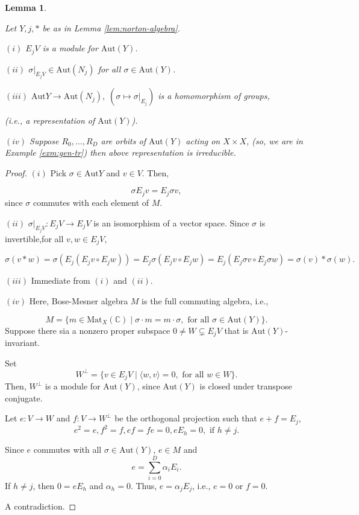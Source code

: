 \documentclass[
]{book}
\newtheorem{lemma}{Lemma}[chapter]
\theoremstyle{definition}
\theoremstyle{definition}
\theoremstyle{definition}
\theoremstyle{definition}
\theoremstyle{remark}
\begin{document}
\begin{lemma}
\protect\hypertarget{lem:autom-of-norton-algebra}{}\label{lem:autom-of-norton-algebra}

Let \(Y, j, \ast\) be as in Lemma \ref{lem:norton-algebra}.

\((i)\) \(E_jV\) is a module for \(\mathrm{Aut}(Y)\).

\((ii)\) \(\sigma|_{E_jV}\in \mathrm{Aut}(N_j)\) for all \(\sigma \in \mathrm{Aut}(Y)\).

\((iii)\) \(\mathrm{Aut}Y \longrightarrow \mathrm{Aut}(N_j), \; (\sigma \mapsto \sigma|_{E_j})\) is a homomorphism of groups,

(i.e., a representation of \(\mathrm{Aut}(Y)\)).

\((iv)\) Suppose \(R_0, \ldots, R_D\) are orbits of \(\mathrm{Aut}(Y)\) acting on \(X\times X\), (so, we are in Example \ref{exm:gen-tr}) then above representation is irreducible.

\end{lemma}

\begin{proof}
\leavevmode

\((i)\) Pick \(\sigma\in \mathrm{Aut}Y\) and \(v\in V\). Then,

\[\sigma E_j v = E_j\sigma v,\]
since \(\sigma\) commutes with each element of \(M\).

\((ii)\) \(\sigma|_{E_jV}: E_jV \to E_jV\) is an isomorphism of a vector space. Since \(\sigma\) is invertible,for all \(v,w\in E_jV\),

\[\sigma(v\ast w) = \sigma(E_j(E_jv\circ E_jw)) = E_j\sigma(E_jv\circ E_jw) = E_j(E_j\sigma v\circ E_j\sigma w) = \sigma(v)\ast \sigma(w).\]

\((iii)\) Immediate from \((i)\) and \((ii)\).

\((iv)\) Here, Bose-Mesner algebra \(M\) is the full commuting algebra, i.e.,

\[M = \{m\in \mathrm{Mat}_X(\mathbb{C})\mid \sigma\cdot m = m\cdot \sigma, \text{ for all }\sigma\in \mathrm{Aut}(Y)\}.\]
Suppose there sia a nonzero proper subspace \(0\neq W\subsetneq E_jV\) that is \(\mathrm{Aut}(Y)\)-invariant.

Set
\[W^\bot = \{v\in E_jV\mid \langle w, v\rangle = 0, \text{ for all }w\in W\}.\]
Then, \(W^\bot\) is a module for \(\mathrm{Aut}(Y)\), since \(\mathrm{Aut}(Y)\) is closed under transpose conjugate.

Let \(e: V\to W\) and \(f: V\to W^\bot\) be the orthogonal projection such that \(e + f = E_j\),
\[e^2 = e, f^2 = f, ef = fe = 0, eE_h = 0, \text{ if } h\neq j.\]

Since \(e\) commutes with all \(\sigma\in \mathrm{Aut}(Y)\), \(e\in M\) and
\[e = \sum_{i=0}^D \alpha_i E_i.\]
If \(h\neq j\), then \(0 = eE_h\) and \(\alpha_h = 0\). Thus, \(e = \alpha_jE_j\), i.e.,
\(e=0\) or \(f=0\).

A contradiction.

\end{proof}
\end{document}
